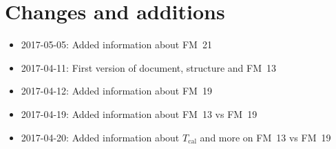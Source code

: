 \chapter{Changes and additions}
\label{ch:changes}

\begin{itemize}
    \item 2017-05-05: Added information about FM~21
    \item 2017-04-11: First version of document, structure and FM~13
    \item 2017-04-12: Added information about FM~19
    \item 2017-04-19: Added information about FM~13 vs FM~19
    \item 2017-04-20: Added information about $T_\mathrm{cal}$
                      and more on FM~13 vs FM~19
\end{itemize}

